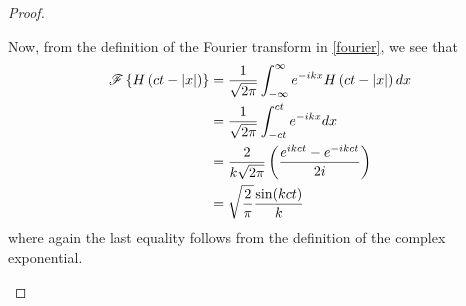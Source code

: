 \begin{proof}
\begin{enumerate}
      Now, from the definition of the Fourier transform in \eqref{fourier}, we see that
      \begin{align*}
        \displaystyle \mathscr{F}\left\{ { H \left( ct - |x| \right) } \right\} &= \frac{1}{\sqrt{2\pi}}\int_{-\infty}^{\infty} e^{-ik x} H \left( ct - |x| \right) dx\\
        &= \frac{1}{\sqrt{2\pi}}\int_{-ct}^{ct} e^{-ik x} dx\\
        &= \frac{2}{k\sqrt{2\pi}} \left(\frac{e^{ikct} - e^{-ikct}}{2i}\right) \\
        &= \sqrt{\frac{2}{\pi}}\frac{\sin(kct)}{k}
      \end{align*}
      where again the last equality follows from the definition of the complex exponential.
  \end{enumerate}
\end{proof}
\newpage
